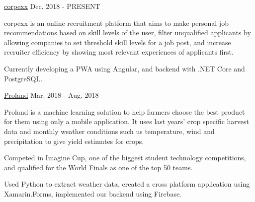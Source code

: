 
\vspace*{-1.5mm}
\begin{cventries}

  \project
    {\href{http://corpexx.com}{corpexx}} %
    {Dec. 2018 - PRESENT} %
    {
      \begin{cvitems}
        \item {corpexx is an online recruitment platform that aims to make personal job recommendations based on skill levels of the user, filter unqualified applicants by allowing companies to set threshold skill levels for a job post, and increase recruiter efficiency by showing most relevant experiences of applicants first.}
        \item {Currently developing a PWA using Angular, and backend with .NET Core and PostgreSQL.}
      \end{cvitems}
    }

  \project
    {\href{http://prolandfarming.com}{Proland}} %
    {Mar. 2018 - Aug. 2018} %
    {
      \begin{cvitems}
        \item {Proland is a machine learning solution to help farmers choose the best product for them using only a mobile application. It uses last years' crop specific harvest data and monthly weather conditions such us temperature, wind and precipitation to give yield estimates for crops.}
        \item {Competed in Imagine Cup, one of the biggest student technology competitions, and qualified for the World Finals as one of the top 50 teams.}
        \item {Used Python to extract weather data, created a cross platform application using Xamarin.Forms, implemented our backend using Firebase.}
      \end{cvitems}
    }
\end{cventries}
